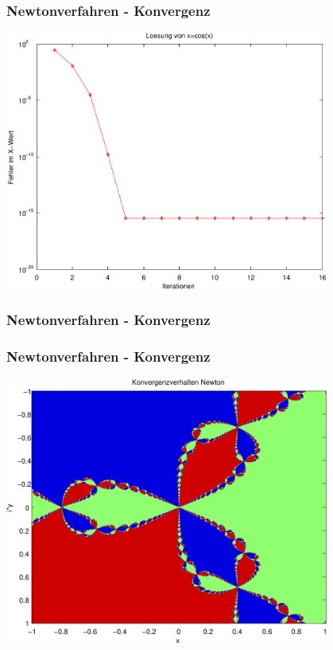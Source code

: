 \documentclass[hyperref={xetex}]{beamer}
\begin{document}
\begin{frame}[fragile]\frametitle{Newtonverfahren - Konvergenz}
\begin{center}
 \includegraphics[width=0.8\textwidth]{figures/newton.pdf}
\end{center}
\end{frame}


\begin{frame}[fragile]\frametitle{Newtonverfahren - Konvergenz}

\end{frame}


\begin{frame}[fragile]\frametitle{Newtonverfahren - Konvergenz}
\begin{center}
 \includegraphics[width=0.8\textwidth]{figures/newton_konvergenz.pdf}
\end{center}
\end{frame}
\end{document}

